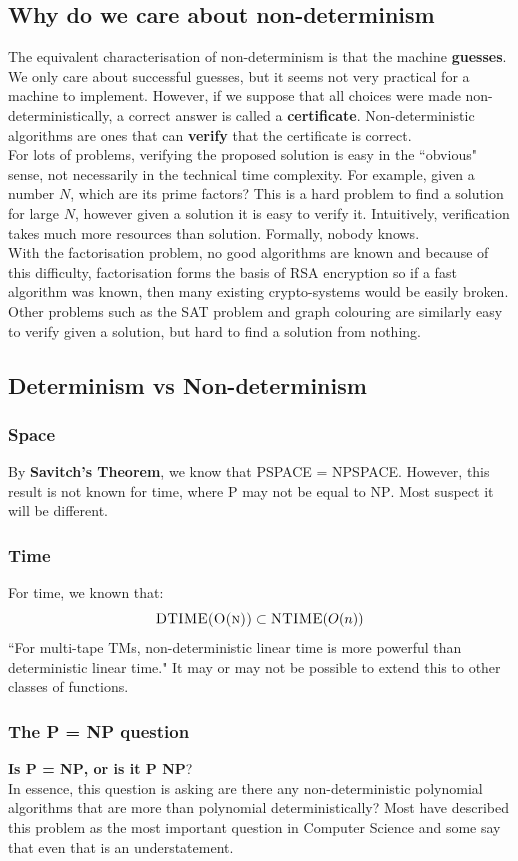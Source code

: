 \documentclass{article}
\theoremstyle{definition}
\newcommand{\n}[0]{\\[\baselineskip]}
\begin{document}
\subsection{Why do we care about non-determinism}
The equivalent characterisation of non-determinism is that the machine \textbf{guesses}. We only care about successful guesses, but it seems not very practical for a machine to implement. However, if we suppose that all choices were made non-deterministically, a correct answer is called a \textbf{certificate}. Non-deterministic algorithms are ones that can \textbf{verify} that the certificate is correct.
\n
For lots of problems, verifying the proposed solution is easy in the ``obvious" sense, not necessarily in the technical time complexity. For example, given a number $N$, which are its prime factors? This is a hard problem to find a solution for large $N$, however given a solution it is easy to verify it. Intuitively, verification takes much more resources than solution. Formally, nobody knows.
\n
With the factorisation problem, no good algorithms are known and because of this difficulty, factorisation forms the basis of RSA encryption so if a fast algorithm was known, then many existing crypto-systems would be easily broken. Other problems such as the SAT problem and graph colouring are similarly easy to verify given a solution, but hard to find a solution from nothing. 
\subsection{Determinism vs Non-determinism}
\subsubsection{Space}
By \textbf{Savitch's Theorem}, we know that \textsc{PSPACE} = \textsc{NPSPACE}. However, this result is not known for time, where \textsc{P} may not be equal to \textsc{NP}. Most suspect it will be different. 
\subsubsection{Time}
For time, we known that:
\begin{equation}
\textsc{DTIME(O(n))} \subset \textsc{NTIME}(O(n))
\end{equation}
``For multi-tape TMs, non-deterministic linear time is more powerful than deterministic linear time." It may or may not be possible to extend this to other classes of functions.
\subsubsection{The P = NP question}
\textbf{Is \textsc{P} = \textsc{NP}, or is it \textsc{P} \neq \textsc{NP}}?
\n
In essence, this question is asking are there any non-deterministic polynomial algorithms that are more than polynomial deterministically? Most have described this problem as the most important question in Computer Science and some say that even that is an understatement.
\end{document}
